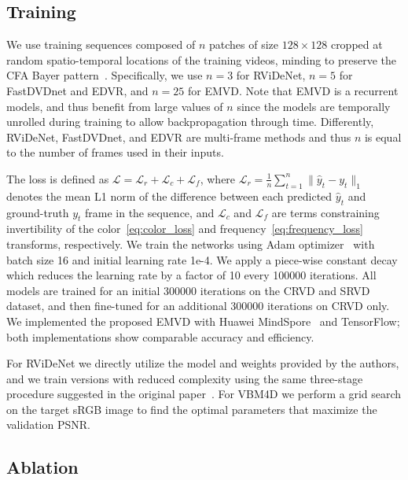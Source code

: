 \documentclass[final]{cvpr}
\begin{document}
    \subsection{Training}
    \label{section:training}
    
    We use training sequences composed of $n$ patches of size $128 \times 128$ cropped at random spatio-temporal locations of the training videos, minding to preserve the CFA Bayer pattern~\cite{liu2019bayer}. Specifically, we use $n=3$ for RViDeNet, $n=5$ for FastDVDnet and EDVR, and $n=25$ for EMVD. Note that EMVD is a recurrent models, and thus benefit from large values of $n$ since the models are temporally unrolled during training to allow backpropagation through time. Differently, RViDeNet, FastDVDnet, and EDVR are multi-frame methods and thus $n$ is equal to the number of frames used in their inputs.
    
    The loss is defined as $\mathcal{L} = \mathcal{L}_r + \mathcal{L}_c + \mathcal{L}_f$, where $\mathcal{L}_r = \frac{1}{n} \sum_{t=1}^n \parallel \hat{y}_t - y_t \parallel_1$ denotes the mean L1 norm of the difference between each predicted $\hat{y}_t$ and ground-truth $y_t$ frame in the sequence, and $\mathcal{L}_c$ and $\mathcal{L}_f$ are terms constraining invertibility of the color~\eqref{eq:color_loss} and frequency~\eqref{eq:frequency_loss} transforms, respectively. We train the networks using Adam optimizer~\cite{kingma2014adam} with batch size 16 and initial learning rate 1e-4. We apply a piece-wise constant decay which reduces the learning rate by a factor of 10 every 100000 iterations. All models are trained for an initial 300000 iterations on the CRVD and SRVD dataset, and then fine-tuned for an additional 300000 iterations on CRVD only. We implemented the proposed EMVD with Huawei MindSpore~\cite{mindspore} and TensorFlow; both implementations show comparable accuracy and efficiency.

    For RViDeNet we directly utilize the model and weights provided by the authors, and we train versions with reduced complexity using the same three-stage procedure suggested in the original paper~\cite{yue2020supervised}. For VBM4D we perform a grid search on the target sRGB image to find the optimal parameters that maximize the validation PSNR.
    
    
    \subsection{Ablation}
    \label{section:ablation}
    
\end{document}
